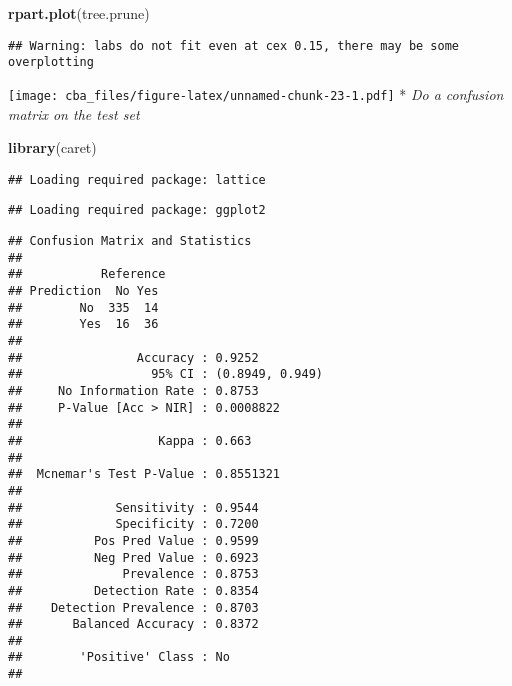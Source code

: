\documentclass[]{article}
\newenvironment{Shaded}{\begin{snugshade}}{\end{snugshade}}
\newcommand{\DataTypeTok}[1]{\textcolor[rgb]{0.13,0.29,0.53}{#1}}
\newcommand{\KeywordTok}[1]{\textcolor[rgb]{0.13,0.29,0.53}{\textbf{#1}}}
\newcommand{\NormalTok}[1]{#1}
\newcommand{\OperatorTok}[1]{\textcolor[rgb]{0.81,0.36,0.00}{\textbf{#1}}}
\newcommand{\StringTok}[1]{\textcolor[rgb]{0.31,0.60,0.02}{#1}}
\begin{document}
\begin{Shaded}
\begin{Highlighting}[]
\KeywordTok{rpart.plot}\NormalTok{(tree.prune)}
\end{Highlighting}
\end{Shaded}

\begin{verbatim}
## Warning: labs do not fit even at cex 0.15, there may be some overplotting
\end{verbatim}

\texttt{[image: cba\_files/figure-latex/unnamed-chunk-23-1.pdf]} *
\emph{Do a confusion matrix on the test set}

\begin{Shaded}
\begin{Highlighting}[]
\KeywordTok{library}\NormalTok{(caret)}
\end{Highlighting}
\end{Shaded}

\begin{verbatim}
## Loading required package: lattice
\end{verbatim}

\begin{verbatim}
## Loading required package: ggplot2
\end{verbatim}

\begin{Shaded}
\end{Shaded}

\begin{verbatim}
## Confusion Matrix and Statistics
## 
##           Reference
## Prediction  No Yes
##        No  335  14
##        Yes  16  36
##                                          
##                Accuracy : 0.9252         
##                  95% CI : (0.8949, 0.949)
##     No Information Rate : 0.8753         
##     P-Value [Acc > NIR] : 0.0008822      
##                                          
##                   Kappa : 0.663          
##                                          
##  Mcnemar's Test P-Value : 0.8551321      
##                                          
##             Sensitivity : 0.9544         
##             Specificity : 0.7200         
##          Pos Pred Value : 0.9599         
##          Neg Pred Value : 0.6923         
##              Prevalence : 0.8753         
##          Detection Rate : 0.8354         
##    Detection Prevalence : 0.8703         
##       Balanced Accuracy : 0.8372         
##                                          
##        'Positive' Class : No             
## 
\end{verbatim}
\end{document}
